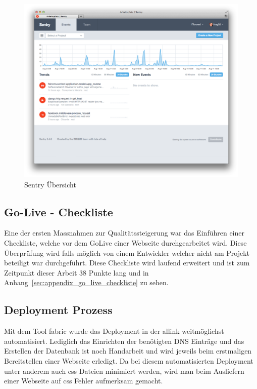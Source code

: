 \begin{figure}[h]
\centering
\includegraphics[width=1\textwidth]{images/sentry.png}
\caption{Sentry Übersicht}
\label{fig:sentry_index}
\end{figure}

\subsection{Go-Live - Checkliste}
\label{sub:go_live_checkliste}
Eine der ersten Massnahmen zur Qualitätssteigerung war das Einführen einer Checkliste, welche vor dem GoLive einer Webseite durchgearbeitet wird. Diese Überprüfung wird falls möglich von einem Entwickler welcher nicht am Projekt beteiligt war durchgeführt. Diese Checkliste wird laufend erweitert und ist zum Zeitpunkt dieser Arbeit 38 Punkte lang und in Anhang~\ref{sec:appendix_go_live_checkliste} zu sehen.

\subsection{Deployment Prozess}
\label{sub:deployment_prozess}
Mit dem Tool fabric wurde das Deployment in der allink weitmöglichst automatisiert. Lediglich das Einrichten der benötigten DNS Einträge und das Erstellen der Datenbank ist noch Handarbeit und wird jeweils beim erstmaligen Bereitstellen einer Webseite erledigt. Da bei diesem automatisierten Deployment unter anderem auch css Dateien minimiert werden, wird man beim Ausliefern einer Webseite auf css Fehler aufmerksam gemacht.